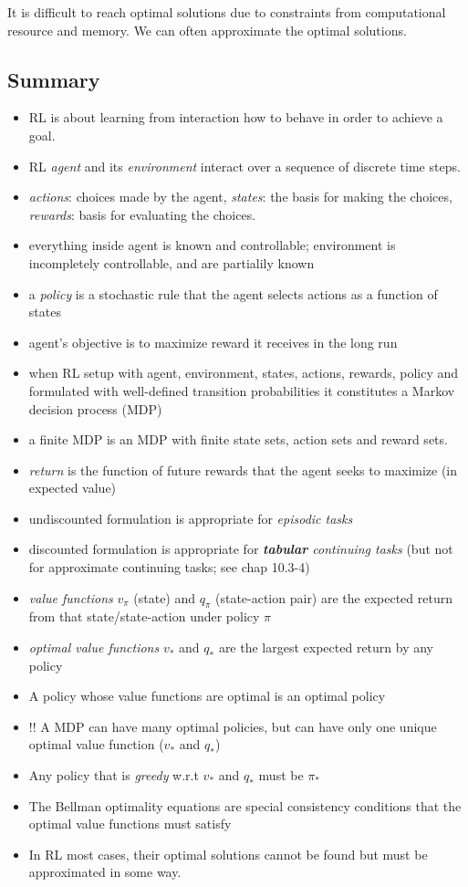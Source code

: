\documentclass[lang=en,mode=geye,device=normal,color=blue,14pt]{elegantnote}
\DeclareMathOperator*{\1}{\mathbbm{1}}
\begin{document}
It is difficult to reach optimal solutions due to constraints from computational resource and memory. We can often approximate the optimal solutions.

\subsection{Summary}

\begin{itemize}
\item RL is about learning from interaction how to behave in order to achieve a goal.
\item RL \textit{agent} and its \textit{environment} interact over a sequence of discrete time steps.
\item \textit{actions}: choices made by the agent, \textit{states}: the basis for making the choices, \textit{rewards}: basis for evaluating the choices.
\item everything inside agent is known and controllable; environment is incompletely controllable, and are partialily known
\item a \textit{policy} is a stochastic rule that the agent selects actions as a function of states
\item agent's objective is to maximize reward it receives in the long run
\item when RL setup with agent, environment, states, actions, rewards, policy and formulated with well-defined transition probabilities it constitutes a Markov decision process (MDP)
\item a finite MDP is an MDP with finite state sets, action sets and reward sets.
\item \textit{return} is the function of future rewards that the agent seeks to maximize (in expected value)
\item undiscounted formulation is appropriate for \textit{episodic tasks}
\item discounted formulation is appropriate for \textit{\textbf{tabular} continuing tasks} (but not for approximate continuing tasks; see chap 10.3-4)
\item \textit{value functions} $v_\pi$ (state) and $q_\pi$ (state-action pair) are the expected return from that state/state-action under policy $\pi$
\item \textit{optimal value functions} $v_*$ and $q_*$ are the largest expected return by any policy
\item A policy whose value functions are optimal is an optimal policy
\item !! A MDP can have many optimal policies, but can have only one unique optimal value function ($v_*$ and $q_*$)
\item Any policy that is \textit{greedy} w.r.t $v_*$ and $q_*$ must be $\pi_*$
\item The Bellman optimality equations are special consistency conditions that the optimal value functions must satisfy
\item In RL most cases, their optimal solutions cannot be found but must be approximated in some way.
\end{itemize}
\end{document}
